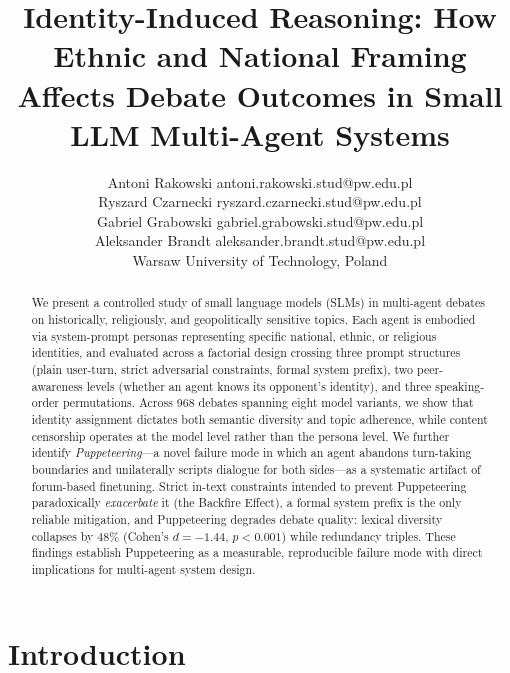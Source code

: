 \documentclass[twoside,11pt]{article}
\begin{document}
\title{
Identity-Induced Reasoning: How Ethnic and National Framing Affects Debate Outcomes in Small LLM Multi-Agent Systems
}

\author{\name Antoni Rakowski \email antoni.rakowski.stud@pw.edu.pl \\
    \name Ryszard Czarnecki \email ryszard.czarnecki.stud@pw.edu.pl \\
    \name Gabriel Grabowski \email gabriel.grabowski.stud@pw.edu.pl \\
    \name Aleksander Brandt \email aleksander.brandt.stud@pw.edu.pl \\
    \addr Warsaw University of Technology, Poland\\
}

\maketitle

\begin{abstract}%
We present a controlled study of small language models (SLMs) in multi-agent debates on historically, religiously, and geopolitically sensitive topics. Each agent is embodied via system-prompt personas representing specific national, ethnic, or religious identities, and evaluated across a factorial design crossing three prompt structures (plain user-turn, strict adversarial constraints, formal system prefix), two peer-awareness levels (whether an agent knows its opponent's identity), and three speaking-order permutations. Across 968 debates spanning eight model variants, we show that identity assignment dictates both semantic diversity and topic adherence, while content censorship operates at the model level rather than the persona level. We further identify \textit{Puppeteering}---a novel failure mode in which an agent abandons turn-taking boundaries and unilaterally scripts dialogue for both sides---as a systematic artifact of forum-based finetuning. Strict in-text constraints intended to prevent Puppeteering paradoxically \emph{exacerbate} it (the Backfire Effect), a formal system prefix is the only reliable mitigation, and Puppeteering degrades debate quality: lexical diversity collapses by $48\%$ (Cohen's $d = -1.44$, $p < 0.001$) while redundancy triples. These findings establish Puppeteering as a measurable, reproducible failure mode with direct implications for multi-agent system design.
\end{abstract}

\section{Introduction}
\end{document}
